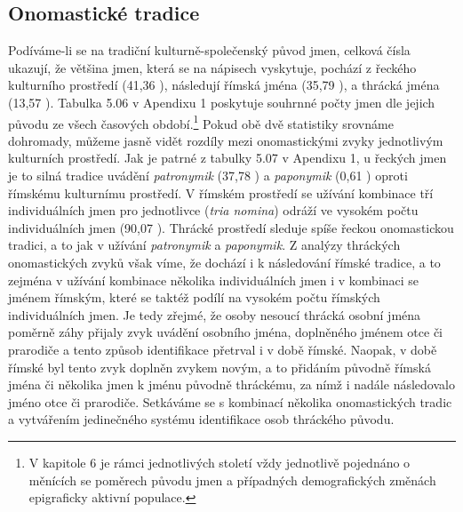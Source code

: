 
\subsection[onomastické-tradice]{Onomastické tradice}

Podíváme-li se na tradiční kulturně-společenský původ jmen, celková čísla ukazují, že většina jmen, která se na nápisech vyskytuje, pochází z řeckého kulturního prostředí (41,36 ), následují římská jména (35,79 ), a thrácká jména (13,57 ). Tabulka 5.06 v Apendixu 1 poskytuje souhrnné počty jmen dle jejich původu ze všech časových období.\footnote{V kapitole 6 je rámci jednotlivých století vždy jednotlivě pojednáno o měnících se poměrech původu jmen a případných demografických změnách epigraficky aktivní populace.} Pokud obě dvě statistiky srovnáme dohromady, můžeme jasně vidět rozdíly mezi onomastickými zvyky jednotlivým kulturních prostředí. Jak je patrné z tabulky 5.07 v Apendixu 1, u řeckých jmen je to silná tradice uvádění {\em patronymik} (37,78 ) a {\em paponymik} (0,61 ) oproti římskému kulturnímu prostředí. V římském prostředí se užívání kombinace tří individuálních jmen pro jednotlivce ({\em tria nomina}) odráží ve vysokém počtu individuálních jmen (90,07 ). Thrácké prostředí sleduje spíše řeckou onomastickou tradici, a to jak v užívání {\em patronymik} a {\em paponymik}. Z analýzy thráckých onomastických zvyků však víme, že dochází i k následování římské tradice, a to zejména v užívání kombinace několika individuálních jmen i v kombinaci se jménem římským, které se taktéž podílí na vysokém počtu římských individuálních jmen. Je tedy zřejmé, že osoby nesoucí thrácká osobní jména poměrně záhy přijaly zvyk uvádění osobního jména, doplněného jménem otce či prarodiče a tento způsob identifikace přetrval i v době římské. Naopak, v době římské byl tento zvyk doplněn zvykem novým, a to přidáním původně římská jména či několika jmen k jménu původně thráckému, za nímž i nadále následovalo jméno otce či prarodiče. Setkáváme se s kombinací několika onomastických tradic a vytvářením jedinečného systému identifikace osob thráckého původu.

